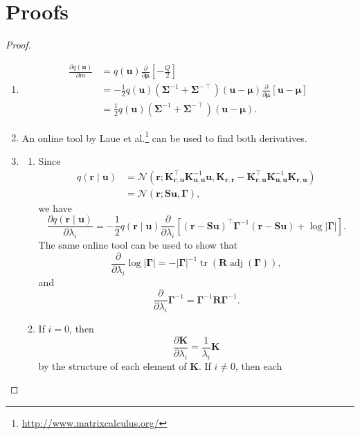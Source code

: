 \documentclass{mpaper}
\DeclareMathOperator{\adj}{adj}
\DeclareMathOperator{\tr}{tr}
\newcommand{\Kuu}{\mathbf{K}_{\mathbf{u},\mathbf{u}}}
\newcommand{\Krr}{\mathbf{K}_{\mathbf{r},\mathbf{r}}}
\newcommand{\Kru}{\mathbf{K}_{\mathbf{r},\mathbf{u}}}
\newcommand{\dm}{\frac{\partial}{\partial\bm\mu}}
\newcommand{\dl}{\frac{\partial}{\partial \lambda_i}}
\begin{document}



\appendix
\section{Proofs} \label{appendix:proofs}

\derivatives*
\begin{proof}
  \leavevmode
  \begin{enumerate}
  \item
    \[
      \begin{split}
        \frac{\partial q(\mathbf{u})}{\partial m} &=
        q(\mathbf{u})\dm\left[-\frac{Q}{2}\right]
        \\
        &= -\frac{1}{2}q(\mathbf{u})(\bm\Sigma^{-1} +
        \bm\Sigma^{-\intercal})(\mathbf{u} - \bm\mu)\dm[\mathbf{u} -
        \bm\mu] \\
        &= \frac{1}{2}q(\mathbf{u})(\bm\Sigma^{-1} +
        \bm\Sigma^{-\intercal})(\mathbf{u} - \bm\mu).
      \end{split}
    \]
  \item An online tool by Laue et
    al.\footnote{\url{http://www.matrixcalculus.org/}}
    \cite{DBLP:conf/nips/LaueMG18} can be used to find both derivatives.
  \item
    \begin{enumerate}
    \item Since
    \begin{align*}
      q(\mathbf{r} \mid \mathbf{u}) &= \mathcal{N}(\mathbf{r};
      \Kru^\intercal\Kuu^{-1}\mathbf{u}, \Krr - \Kru^\intercal \Kuu^{-1}\Kru) \\
      &= \mathcal{N}(\mathbf{r}; \mathbf{Su}, \bm\Gamma),
    \end{align*}
    we have
    \[
      \frac{\partial q(\mathbf{r} \mid \mathbf{u})}{\partial \lambda_i} =
      -\frac{1}{2}q(\mathbf{r} \mid \mathbf{u}) \dl[(\mathbf{r} -
      \mathbf{Su})^\intercal\bm\Gamma^{-1}(\mathbf{r} - \mathbf{Su}) +
      \log|\bm\Gamma|].
    \]
    The same online tool can be used to show that
    \[
      \dl \log|\bm\Gamma| = -|\bm\Gamma|^{-1}\tr(\mathbf{R}\adj(\bm\Gamma)),
    \]
    and
    \[
      \dl \bm\Gamma^{-1} = \bm\Gamma^{-1}\mathbf{R}\bm\Gamma^{-1}.
    \]
  \item
    If $i=0$, then
    \[
      \frac{\partial \mathbf{K}}{\partial \lambda_i} =
      \frac{1}{\lambda_i}\mathbf{K}
    \]
    by the structure of each element of $\mathbf{K}$. If $i \ne 0$, then each

\end{enumerate}
\end{enumerate}
\end{proof}
\end{document}
